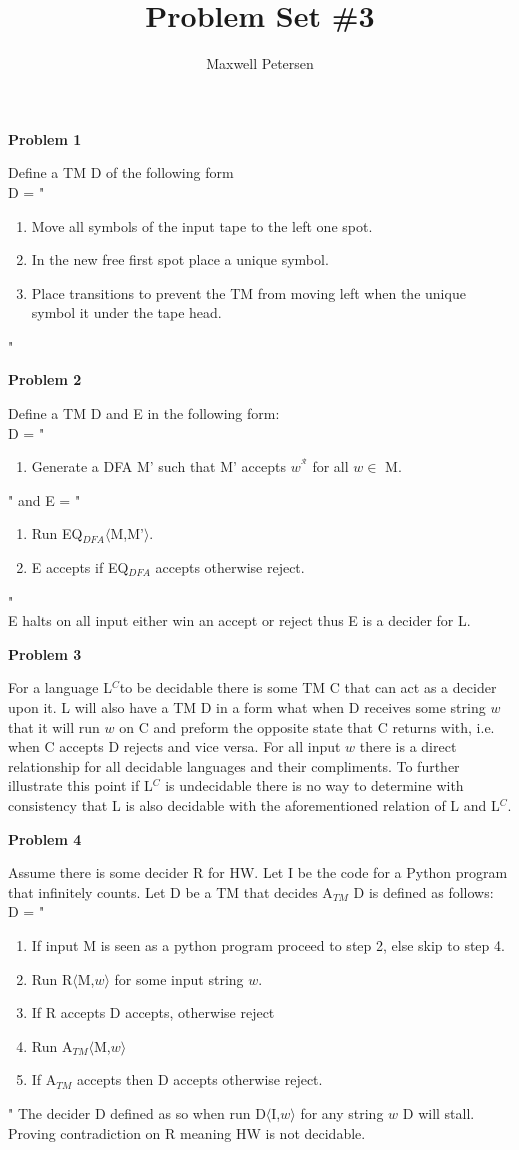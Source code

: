 \documentclass[letterpaper,12pt]{article}
\title{Problem Set \#3}
\author{Maxwell Petersen}
\makeatletter
\newcommand{\rev}{^{\scriptscriptstyle\mathcal{R}}}
\newcommand\exercise[1]{\par\vspace{4ex}\normalfont\normalsize\noindent
\textbf{\large Problem #1}\par\nobreak\@afterindentfalse\@afterheading}
\makeatother
\begin{document}
\maketitle

\exercise{1}
Define a TM D of the following form\\
D = "
\begin{enumerate}
\item Move all symbols of the input tape to the left one spot.
\item In the new free first spot place a unique symbol.
\item Place transitions to prevent the TM from moving left when the unique symbol it under the tape head.
\end{enumerate}
"

\exercise{2}
Define a TM D and E in the following form:\\
D = "
\begin{enumerate}
\item Generate a DFA M' such that M' accepts $w^{\rev}$ for all $w \in$ M.
\end{enumerate}
"\newline
and E = "
\begin{enumerate}
\item Run EQ$_{DFA}\langle$M,M'$\rangle$.
\item E accepts if EQ$_{DFA}$ accepts otherwise reject.
\end{enumerate}
"\\
E halts on all input either win an accept or reject thus E is a decider for L.
\cleardoublepage
\exercise{3}
For a language L$^C$to be decidable there is some TM C that can act as a decider upon it. L will also have a TM D  in a form what when D receives some string $w$ that it will run $w$ on C and preform  the opposite state that C returns with, i.e. when C accepts D rejects and vice versa. For all input $w$ there is a direct relationship for all decidable languages and their compliments. To further illustrate this point if L$^C$ is undecidable there is no way to determine with consistency that L is also decidable with the aforementioned relation of L and L$^C$.

\exercise{4}
Assume there is some decider R for HW. Let I be the code for a Python program that infinitely counts. Let D be a TM that decides A$_{TM}$ D is defined as follows:\\
D = "
\begin{enumerate}
\item If input M is seen as a python program proceed to step 2, else skip to step 4.
\item Run R$\langle$M,$w\rangle$ for some input string $w$.
\item 	If R accepts D accepts, otherwise reject
\item Run A$_{TM}\langle$M,$w\rangle$
\item 	If A$_{TM}$ accepts then D accepts otherwise reject.
\end{enumerate}
"
The decider D defined as so when run D$\langle$I,$w\rangle$ for any string $w$ D will stall. Proving contradiction on R meaning HW is not decidable.
\end{document}
